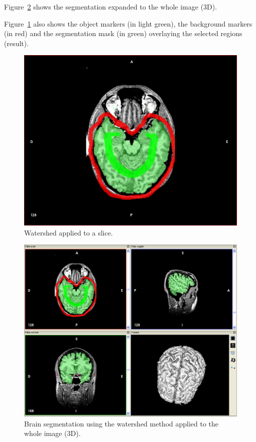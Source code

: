 Figure~\ref{fig:watershed_3d} shows the segmentation expanded to the whole image (3D).

Figure~\ref{fig:watershed_2d} also shows the object markers (in light green), the background markers (in red) and the segmentation mask (in green) overlaying the selected regions (result).

\begin{figure}[!htb]
\centering
\includegraphics[scale=0.2]{../user_guide_figures/invesalius_screen/segmentation_watershed_axial.png}
\caption{Watershed applied to a slice.}
\label{fig:watershed_2d}
\end{figure}

\begin{figure}[!htb]
\centering
\includegraphics[scale=0.4]{../user_guide_figures/invesalius_screen/segmentation_watershed_multiplanar_3d_pt.png}
\caption{Brain segmentation using the watershed method applied to the whole image (3D).}
\label{fig:watershed_3d}
\end{figure}

